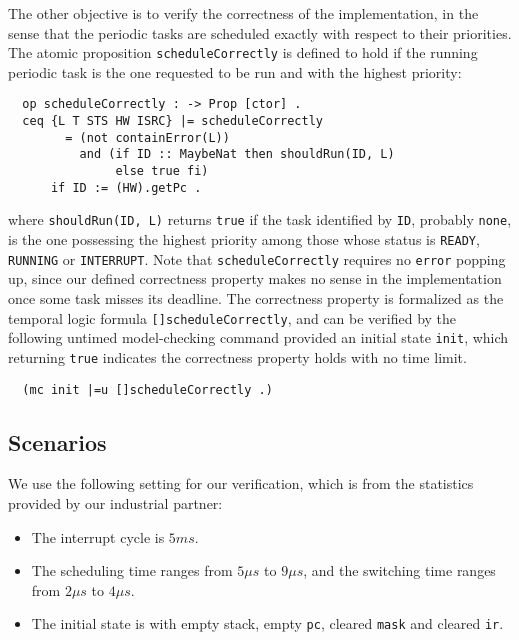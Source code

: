 \documentclass{llncs}
\begin{document}
The other objective is to verify the correctness of the
implementation, in the sense that the periodic tasks are scheduled
exactly with respect to their priorities. The atomic proposition
\verb|scheduleCorrectly| is defined to hold if the running periodic
task is the one requested to be run and with the highest priority:
\begin{verbatim}
  op scheduleCorrectly : -> Prop [ctor] .
  ceq {L T STS HW ISRC} |= scheduleCorrectly 
        = (not containError(L))
          and (if ID :: MaybeNat then shouldRun(ID, L)
               else true fi)
      if ID := (HW).getPc .
\end{verbatim}
where \verb|shouldRun(ID, L)| returns \verb|true| if the task
identified by \verb|ID|, probably \verb|none|, is the one possessing
the highest priority among those whose status is \verb|READY|,
\verb|RUNNING| or \verb|INTERRUPT|. Note that \verb|scheduleCorrectly|
requires no \verb|error| popping up, since our defined correctness
property makes no sense in the implementation once some task misses
its deadline. The correctness property is formalized as the temporal
logic formula \verb|[]scheduleCorrectly|, and can be verified by the
following untimed model-checking command provided an initial state
\verb|init|, which returning \verb|true| indicates the correctness
property holds with no time limit.
\begin{verbatim}
  (mc init |=u []scheduleCorrectly .)
\end{verbatim}

\subsection{Scenarios}
\label{ss:results}
We use the following setting for our verification, which is from the 
statistics provided by our industrial partner:
\begin{itemize}
\item The interrupt cycle is $5ms$.
\item The scheduling time ranges from $5{\mu}s$ to $9{\mu}s$, and the
switching time ranges from $2{\mu}s$ to $4{\mu}s$.
\item The initial state is with empty stack, empty \verb|pc|, cleared 
\verb|mask| and cleared \verb|ir|.
\end{itemize}
\end{document}

